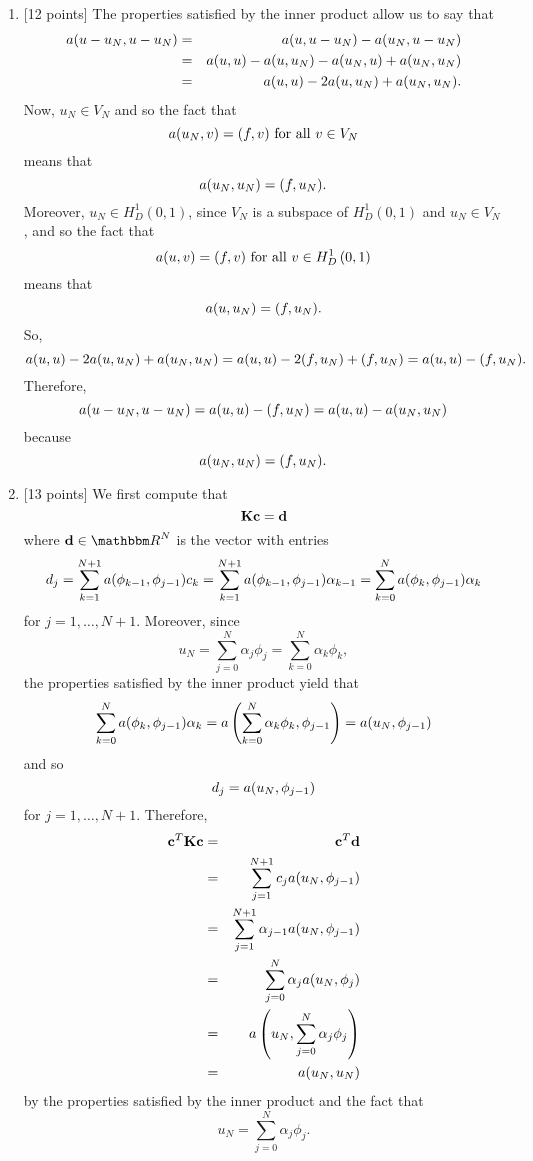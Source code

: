 \begin{solution}
\begin{enumerate}
\item {[12 points]} The properties satisfied by the inner product allow us to say that
\begin{eqnarray*}
a(u-u_N,u-u_N)&=&a(u,u-u_N)-a(u_N,u-u_N)
\\
&=&a(u,u)-a(u,u_N)-a(u_N,u)+a(u_N,u_N)
\\
&=&a(u,u)-2a(u,u_N)+a(u_N,u_N).
\end{eqnarray*}
Now, $u_N\in V_N$ and so the fact that
\[
a(u_N,v)=(f,v)\mbox{ for all }v\in V_N
\]
means that
\[
a(u_N,u_N)=(f,u_N).
\]
Moreover, $u_N\in H^1_D\left(0,1\right)$, since $V_N$ is a subspace of $H^1_D\left(0,1\right)$ and $u_N\in V_N$, and so the fact that
\[
a(u,v)=(f,v)\mbox{ for all }v\in H^1_D\left(0,1\right)
\]
means that
\[
a(u,u_N)=(f,u_N).
\]
So,
\[
a(u,u)-2a(u,u_N)+a(u_N,u_N)=a(u,u)-2(f,u_N)+(f,u_N)=a(u,u)-(f,u_N).
\]
Therefore,
\[
a(u-u_N,u-u_N)=a(u,u)-(f,u_N)=a(u,u)-a(u_N,u_N)
\]
because
\[
a(u_N,u_N)=(f,u_N).
\]

\item {[13 points]} We first compute that
\[
{\bf K}{\bf c}={\bf d}
\]
where $\Bd\in\R^{N}$ is the vector with entries
\[
d_j=\sum_{k=1}^{N+1}a(\phi_{k-1},\phi_{j-1})c_k=\sum_{k=1}^{N+1}a(\phi_{k-1},\phi_{j-1})\alpha_{k-1}=\sum_{k=0}^Na(\phi_k,\phi_{j-1})\alpha_k
\]
for $j=1,\ldots,N+1$. Moreover, since
\[
u_N=\sum_{j=0}^N\alpha_j\phi_j=\sum_{k=0}^N\alpha_k\phi_k,
\]
the properties satisfied by the inner product yield that
\[
\sum_{k=0}^Na(\phi_k,\phi_{j-1})\alpha_k=a\left(\sum_{k=0}^N\alpha_k\phi_k,\phi_{j-1}\right)=a(u_N,\phi_{j-1})
\]
and so
\[
d_j=a(u_N,\phi_{j-1})
\]
for $j=1,\ldots,N+1$. Therefore,
\begin{eqnarray*}
{\bf c}^T{\bf K}{\bf c}&=&{\bf c}^T{\bf d}
\\
&=&\sum_{j=1}^{N+1}c_ja(u_N,\phi_{j-1})
\\
&=&\sum_{j=1}^{N+1}\alpha_{j-1}a(u_N,\phi_{j-1})
\\
&=&\sum_{j=0}^N\alpha_ja(u_N,\phi_j)
\\
&=&a\left(u_N,\sum_{j=0}^N\alpha_j\phi_j\right)
\\
&=&a(u_N,u_N)
\end{eqnarray*}
by the properties satisfied by the inner product and the fact that
\[
u_N=\sum_{j=0}^N\alpha_j\phi_j.
\]
\end{enumerate}
\end{solution}